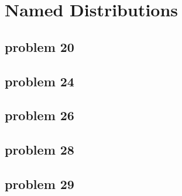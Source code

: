 \section{Named Distributions}

\subsection{problem 20}


\subsection{problem 24}


\subsection{problem 26}


\subsection{problem 28}


\subsection{problem 29}
